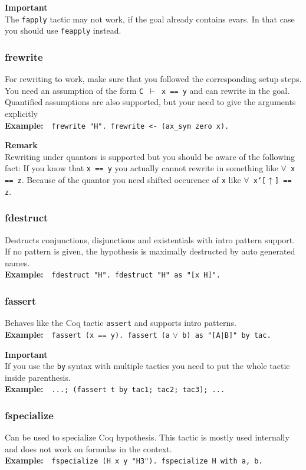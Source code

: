 \documentclass[12pt, a4paper]{article}
\newcommand{\coq}[1]{\texttt{#1}}
\newcommand{\important}[1]{
	\vspace{3pt}
	\begin{boximportant}
		\textcolor{colorimportant}{\textbf{Important}\\#1}
	\end{boximportant}}
\newcommand{\remark}[1]{
	\vspace{3pt}
	\begin{boxremark}
		\textbf{Remark}\\#1
	\end{boxremark}}
\newcommand{\example}[1]{\medskip\\\textbf{Example:}~~#1}
\begin{document}
\important{The \texttt{fapply} tactic may not work, if the goal already contains evars. In that case you should use \texttt{feapply} instead.}



\subsubsection{\ttfamily frewrite}

For rewriting to work, make sure that you followed the corresponding setup steps.
You need an assumption of the form \texttt{C $\vdash$ x == y} and can rewrite in the goal.
Quantified assumptions are also supported, but your need to give the arguments explicitly
\example{\coq{frewrite "H". frewrite <- (ax_sym zero x).}}

\remark{Rewriting under quantors is supported but you should be aware of the following fact: If you know that \coq{x == y} you actually cannot rewrite in something like \texttt{$\forall$~\coq{x == z}}. Because of the quantor you need shifted occurence of \coq{x} like \texttt{$\forall$~\coq{x`[}$\uparrow$\coq{] == z}}.}


\subsubsection{\ttfamily fdestruct}

Destructs conjunctions, disjunctions and existentials with intro pattern support. 
If no pattern is given, the hypothesis is maximally destructed by auto generated names.
\example{\coq{fdestruct "H". fdestruct "H" as "[x H]".}}


\subsubsection{\ttfamily fassert}

Behaves like the Coq tactic \texttt{assert} and supports intro patterns.
\example{\coq{fassert (x == y). fassert (a} $\lor$\coq{ b) as "[A|B]" by tac.}}

\important{If you use the \texttt{by} syntax with multiple tactics you need to put the whole tactic inside parenthesis. \example{\texttt{...; (fassert t by tac1; tac2; tac3); ...}}}


\subsubsection{\ttfamily fspecialize}

Can be used to specialize Coq hypothesis.
This tactic is mostly used internally and does not work on formulas in the context.
\example{\coq{fspecialize (H x y "H3"). fspecialize H with a, b.}}
\end{document}
